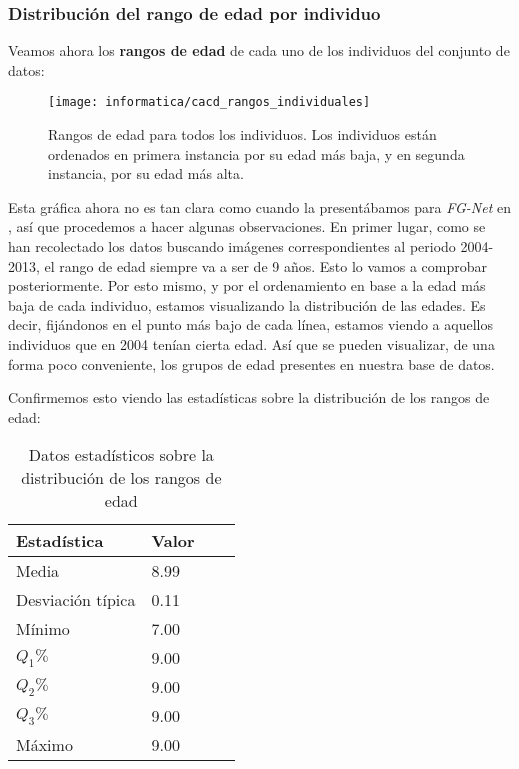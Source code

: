 \subsubsection{Distribución del rango de edad por individuo}

Veamos ahora los \textbf{rangos de edad} de cada uno de los individuos del conjunto de datos:

\begin{figure}[H]
    \centering
    \texttt{[image: informatica/cacd\_rangos\_individuales]}
    \caption{Rangos de edad para todos los individuos. Los individuos están ordenados en primera instancia por su edad más baja, y en segunda instancia, por su edad más alta.}
\end{figure}

Esta gráfica ahora no es tan clara como cuando la presentábamos para \textit{FG-Net} en , así que procedemos a hacer algunas observaciones. En primer lugar, como se han recolectado los datos buscando imágenes correspondientes al periodo 2004-2013, el rango de edad siempre va a ser de 9 años. Esto lo vamos a comprobar posteriormente. Por esto mismo, y por el ordenamiento en base a la edad más baja de cada individuo, estamos visualizando la distribución de las edades. Es decir, fijándonos en el punto más bajo de cada línea, estamos viendo a aquellos individuos que en 2004 tenían cierta edad. Así que se pueden visualizar, de una forma poco conveniente, los grupos de edad presentes en nuestra base de datos.

Confirmemos esto viendo las estadísticas sobre la distribución de los rangos de edad:

\begin{table}[H]
\centering
\begin{tabular}{|l|l|l|l|}
    \hline
    \textbf{Estadística} & \textbf{Valor} \\
    \hline

    Media             & 8.99 \\
    Desviación típica & 0.11 \\
    Mínimo            & 7.00 \\
    $Q_1 \%$          & 9.00 \\
    $Q_2 \%$          & 9.00 \\
    $Q_3 \%$          & 9.00 \\
    Máximo            & 9.00 \\

    \hline

\end{tabular}
    \caption{Datos estadísticos sobre la distribución de los rangos de edad}
\end{table}

